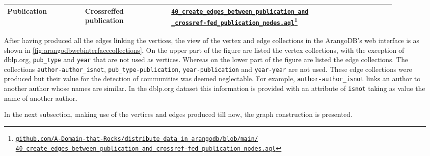 \begin{center}
\begin{longtable}{p{0.18875\linewidth}p{0.20275\linewidth}p{0.52350\linewidth}}
		\hline
		Publication & Crossreffed publication & \href{https://github.com/A-Domain-that-Rocks/distribute_data_in_arangodb/blob/main/40_create_edges_between_publication_and_crossref-fed_publication_nodes.aql}{\texttt{40\_create\_edges\_between\_publication\_and\newline\_crossref-fed\_publication\_nodes.aql}}\footnote{\href{https://github.com/A-Domain-that-Rocks/distribute\_data\_in\_arangodb/blob/main/40\_create\_edges\_between\_publication\_and\_crossref-fed\_publication\_nodes.aql}{\texttt{github.com/A-Domain-that-Rocks/distribute\_data\_in\_arangodb/blob/main/\newline40\_create\_edges\_between\_publication\_and\_crossref-fed\_publication\_nodes.aql}}}\\
		\hline
	\end{longtable}
	\vspace*{-1.35cm}
\end{center}

After having produced all the edges linking the vertices, the view of the vertex and edge collections in the ArangoDB's web interface is as shown in \hyperref[fig:arangodbwebinterfacecollections]{\autoref{fig:arangodbwebinterfacecollections}}.
On the upper part of the figure are listed the vertex collections, with the exception of \gls{dblp.org}, \texttt{pub\_type} and \texttt{year} that are not used as vertices.
Whereas on the lower part of the figure are listed the edge collections.
The collections \texttt{author-author\_isnot}, \texttt{pub\_type-publication}, \texttt{year-publication} and \texttt{year-year} are not used.
These edge collections were produced but their value for the detection of communities was deemed neglectable.
For example, \texttt{author-author\_isnot} links an author to another author whose names are similar.
In the \gls{dblp.org} dataset this information is provided with an attribute of \texttt{isnot} taking as value the name of another author.
\medskip

In the next subsection, making use of the vertices and edges produced till now, the graph construction is presented.

